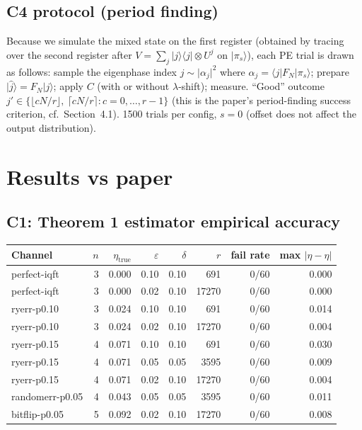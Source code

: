 \documentclass[11pt]{article}
\newcommand{\ket}[1]{\lvert #1 \rangle}
\newcommand{\bra}[1]{\langle #1 \rvert}
\begin{document}
\subsection{C4 protocol (period finding)}
Because we simulate the mixed state on the first register (obtained by
tracing over the second register after $V=\sum_j\ket j\bra j\otimes U^j$
on $\ket{\pi_s}$), each PE trial is drawn as follows: sample the
eigenphase index $j \sim \lvert\alpha_j\rvert^2$ where
$\alpha_j = \bra j F_N \ket{\pi_s}$; prepare $\ket{\hat j} = F_N \ket j$;
apply $C$ (with or without $\lambda$-shift); measure.  ``Good'' outcome
$j' \in \{\lfloor cN/r \rfloor,\ \lceil cN/r \rceil : c=0,\ldots,r-1\}$
(this is the paper's period-finding success criterion, cf.\ Section~4.1).
1500 trials per config, $s=0$ (offset does not affect the output
distribution).

\section{Results vs paper}

\subsection{C1: Theorem 1 estimator empirical accuracy}

\begin{center}
\begin{tabular}{@{}l r r r r r r r@{}}
\toprule
Channel & $n$ & $\eta_{\text{true}}$ & $\varepsilon$ & $\delta$ & $r$ & fail rate & max $|\hat\eta - \eta|$ \\\midrule
perfect-iqft   & 3 & 0.000 & 0.10 & 0.10 & 691   & 0/60 & 0.000 \\
perfect-iqft   & 3 & 0.000 & 0.02 & 0.10 & 17270 & 0/60 & 0.000 \\
ryerr-p0.10    & 3 & 0.024 & 0.10 & 0.10 & 691   & 0/60 & 0.014 \\
ryerr-p0.10    & 3 & 0.024 & 0.02 & 0.10 & 17270 & 0/60 & 0.004 \\
ryerr-p0.15    & 4 & 0.071 & 0.10 & 0.10 & 691   & 0/60 & 0.030 \\
ryerr-p0.15    & 4 & 0.071 & 0.05 & 0.05 & 3595  & 0/60 & 0.009 \\
ryerr-p0.15    & 4 & 0.071 & 0.02 & 0.10 & 17270 & 0/60 & 0.004 \\
randomerr-p0.05 & 4 & 0.043 & 0.05 & 0.05 & 3595 & 0/60 & 0.011 \\
bitflip-p0.05   & 5 & 0.092 & 0.02 & 0.10 & 17270 & 0/60 & 0.008 \\
\bottomrule
\end{tabular}
\end{center}
\end{document}
